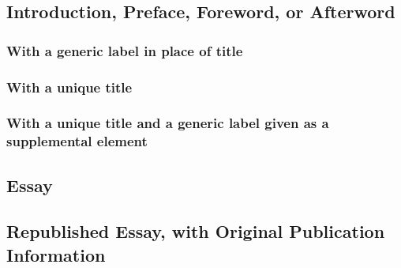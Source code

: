 \documentclass{article}
\begin{document}
\subsection{Introduction, Preface, Foreword, or Afterword} %
\label{sub:introduction_preface_foreword_or_afterword}
\subsubsection{With a generic label in place of title} %
\label{ssub:with_a_generic_label_in_place_of_title}
\begin{refsection}
	\printbibliography[heading=none]
\end{refsection}
\subsubsection{With a unique title} %
\label{ssub:with_a_unique_title}
\begin{refsection}
	\printbibliography[heading=none]
\end{refsection}
\subsubsection{With a unique title and a generic label given as a supplemental element} %
\label{ssub:with_a_unique_title_and_a_generic_label_given_as_a_supplemental_element}
\begin{refsection}
	\printbibliography[heading=none]
\end{refsection}
\subsection{Essay} %
\label{sub:essay}
\begin{refsection}
	\printbibliography[heading=none]
\end{refsection}
\subsection{Republished Essay, with Original Publication Information} %
\label{sub:republished_essay_with_original_publication_information}
\begin{refsection}
	\printbibliography[heading=none]
\end{refsection}
\end{document}
